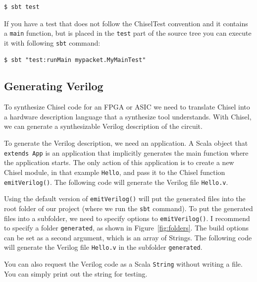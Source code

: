\documentclass[%
    10pt,
    headinclude, footexclude,
    openright, %
    notitlepage,
    cleardoubleempty,
    headsepline,
    pointlessnumbers,
    bibtotoc, idxtotoc,
    ]{scrbook}
\newcommand{\code}[1]{{\lstinline[basicstyle=\small\ttfamily]{#1}}}
\begin{document}
\begin{verbatim}
$ sbt test
\end{verbatim}

If you have a test that does not follow the ChiselTest convention and it contains a \code{main}
function, but is placed in the \code{test} part of the source tree you can execute it
with following \code{sbt} command:

\begin{verbatim}
$ sbt "test:runMain mypacket.MyMainTest"
\end{verbatim}

\subsection{Generating Verilog}


To synthesize Chisel code for an FPGA or ASIC we need to translate Chisel into
a hardware description language that a synthesize tool understands.
With Chisel, we can generate a synthesizable Verilog description of the circuit.

To generate the Verilog description, we need an application. A Scala object that \code{extends App}
is an application that implicitly generates the main function where the application starts.
The only action of this application is to create a new Chisel module, in that example \code{Hello},
and pass it to the Chisel function \code{emitVerilog()}.
The following code will generate the Verilog file \code{Hello.v}.


Using the default version of \code{emitVerilog()} will put the generated files
into the root folder of our project (where we run the \code{sbt} command).
To put the generated files into a subfolder, we need to specify options to \code{emitVerilog()}.
I recommend to specify a folder \code{generated}, as shown in Figure~\ref{fig:folders}.
The build options can be set as a second argument, which is an array of Strings.
The following code will generate the Verilog file \code{Hello.v} in the subfolder \code{generated}.


You can also request the Verilog code as a Scala \code{String} without writing a file.
You can simply print out the string for testing.

\end{document}
